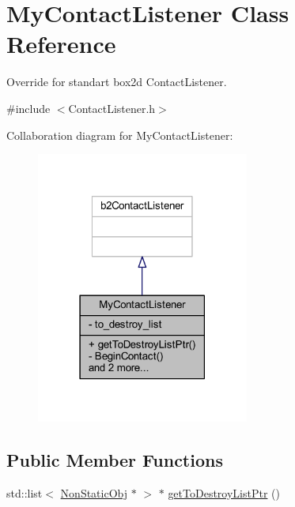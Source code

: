 \hypertarget{class_my_contact_listener}{}\section{My\+Contact\+Listener Class Reference}
\label{class_my_contact_listener}


Override for standart box2d Contact\+Listener.  




{\ttfamily \#include $<$Contact\+Listener.\+h$>$}



Collaboration diagram for My\+Contact\+Listener\+:\nopagebreak
\begin{figure}[H]
\begin{center}
\leavevmode
\includegraphics[width=198pt]{class_my_contact_listener__coll__graph}
\end{center}
\end{figure}
\subsection*{Public Member Functions}
\begin{DoxyCompactItemize}
\item 
std\+::list$<$ \hyperlink{class_non_static_obj}{Non\+Static\+Obj} $\ast$ $>$ $\ast$ \hyperlink{class_my_contact_listener_a3e414c674f98a2f35e2c894923d045b2}{get\+To\+Destroy\+List\+Ptr} ()
\end{DoxyCompactItemize}
